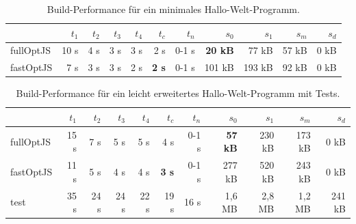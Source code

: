 \documentclass[a4paper, 12pt, hidelinks, listof=totoc, listoftables=totoc, bibliography=totoc]{scrreprt}
\begin{document}
\medskip

\begin{table}[!h]
\begin{tabular}{|l|r|r|r|r|r|r||r|r|r|r|}
\hline           & $t_1$ & $t_2$ & $t_3$ & $t_4$ & $t_c$         & $t_n$ & $s_0$          & $s_1$  & $s_m$ & $s_d$ \\ 
\hline fullOptJS & 10 s  &  4 s  &  3 s  &  3 s  &          2 s  & 0-1 s & \textbf{20 kB} &  77 kB & 57 kB &  0 kB \\ 
\hline fastOptJS &  7 s  &  3 s  &  3 s  &  2 s  &  \textbf{2 s} & 0-1 s &        101 kB  & 193 kB & 92 kB &  0 kB \\ 
\hline 
\end{tabular} 
\caption{Build-Performance für ein minimales Hallo-Welt-Programm.}
\label{table:compiler-performance1}
\end{table}

\begin{table}[!h]
\begin{tabular}{|l|r|r|r|r|r|r||r|r|r|r|}
\hline           & $t_1$ & $t_2$ & $t_3$ & $t_4$ & $t_c$         & $t_n$ & $s_0$          & $s_1$  & $s_m$  & $s_d$ \\ 
\hline fullOptJS & 15 s  &  7 s  &  5 s  &  5 s  &          4 s  & 0-1 s & \textbf{57 kB} & 230 kB & 173 kB &   0 kB \\ 
\hline fastOptJS & 11 s  &  5 s  &  4 s  &  4 s  &  \textbf{3 s} & 0-1 s &        277 kB  & 520 kB & 243 kB &   0 kB \\ 
\hline test      & 35 s  & 24 s  & 24 s  & 22 s  &         19 s  &  16 s &        1,6 MB  & 2,8 MB & 1,2 MB & 241 kB \\ 
\hline 
\end{tabular} 
\caption{Build-Performance für ein leicht erweitertes Hallo-Welt-Programm mit Tests.}
\label{table:compiler-performance2}
\end{table}
\end{document}
